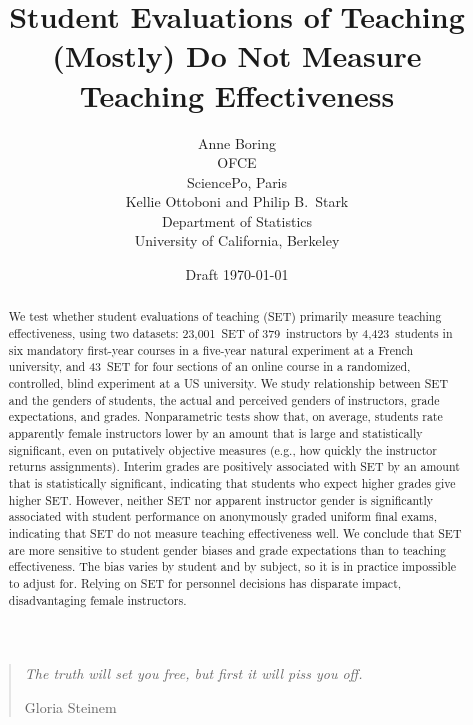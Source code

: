 \documentclass[12pt]{article}
\title{Student Evaluations of Teaching (Mostly) Do Not Measure Teaching Effectiveness}
\author{Anne Boring\\
OFCE\\SciencePo, Paris\\[.2in]
Kellie Ottoboni and Philip B.~Stark\\
Department of Statistics\\
University of California, Berkeley}
\date{Draft \today}
\begin{document}
\maketitle

\newpage
\begin{quotation}
    \emph{The truth will set you free, but first it will piss you off.}
    
     \hfill Gloria Steinem
\end{quotation}

\begin{abstract}

We test whether student evaluations of teaching (SET) 
primarily measure teaching effectiveness, using 
two datasets:
23,001~SET of 379~instructors by 4,423~students in six 
mandatory first-year courses in a five-year natural experiment at a French university, 
and
43~SET for four sections of an online course in a randomized, controlled, 
blind experiment at a US university.
We study relationship between SET and the genders of students, the actual and
perceived genders of instructors, grade expectations, and grades.
Nonparametric tests show that, on average, students rate apparently female instructors lower 
by an amount that is 
large and statistically significant, even on putatively objective measures (e.g., how
quickly the instructor returns assignments).
Interim grades are positively associated with SET
by an amount that is statistically significant, indicating that students who expect
higher grades give higher SET.
However, neither SET nor apparent instructor gender is significantly associated 
with student performance on anonymously graded uniform final exams, indicating
that SET do not measure teaching effectiveness well. 
We conclude that SET are more sensitive to student gender biases and grade 
expectations than to teaching effectiveness.
The bias varies by student and by subject, so it is in practice impossible to adjust for. 
Relying on SET for personnel decisions has disparate impact, disadvantaging 
female instructors.




\end{abstract}
\end{document}

